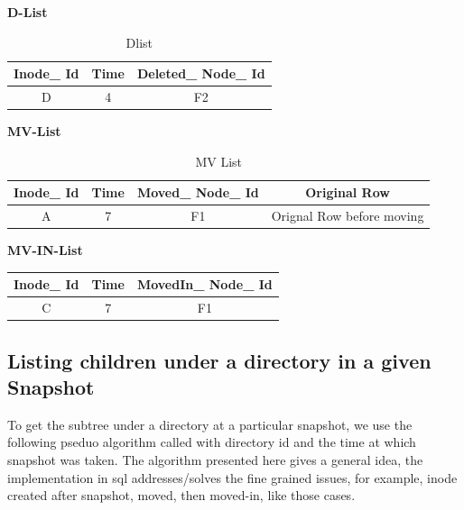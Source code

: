 \begin{table}[!h]
\textbf{D-List}\\

\begin{tabular}{|c|c|c|}
\hline
Inode\_ Id&Time&Deleted\_ Node\_ Id\\
\hline
D&4&F2\\
\hline
\end{tabular}
\label{table:dlist}
\caption{Dlist}
\end{table}

\begin{table}[!h]
\textbf{MV-List}\\

\begin{tabular}{|c|c|c|c|}
\hline
Inode\_ Id&Time&Moved\_ Node\_ Id&Original Row\\
\hline
A&7&F1&Orignal Row before moving\\
\hline
\end{tabular}
\caption{MV List}
\label{table:mvlist}
\end{table}


\textbf{MV-IN-List}\\

\begin{tabular}{|c|c|c|}
\hline
Inode\_ Id&Time&MovedIn\_ Node\_ Id\\
\hline
C&7&F1\\
\hline
\end{tabular}


\pagebreak

\subsection{Listing children under a directory in a given Snapshot}
To get the subtree under a directory at a particular snapshot, we use the following pseduo algorithm called with directory id and the time at which snapshot was taken. The algorithm presented here gives a general idea, the implementation in sql\cite{Snapshot-ls} addresses/solves the fine grained issues, for example, inode created after snapshot, moved, then moved-in, like those cases.


